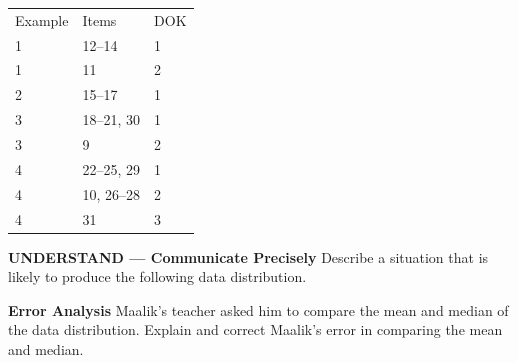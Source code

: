 \documentclass{article}
\newenvironment{item-analysis}{}{}      %
\newenvironment{practice}[2]{}{}        %
\newcommand{\answer}[1]{}               %
\newcommand{\placeholder}[2]{}          %
\newcommand{\te}[1]{}                   %
\begin{document}
\begin{item-analysis}
\begin{tabular}{lll}
Example & Items & DOK \\
1 & 12--14 & 1 \\
1 & 11 & 2 \\
2 & 15--17 & 1 \\
3 & 18--21, 30 & 1 \\
3 & 9 & 2 \\
4 & 22--25, 29 & 1 \\
4 & 10, 26--28 & 2 \\
4 & 31 & 3 \\
\end{tabular}
\end{item-analysis}
\begin{practice}{9}{2}
\textbf{UNDERSTAND — Communicate Precisely} Describe a situation that is likely to produce the following data distribution.
\placeholder{graph}{Six separated green bars at horizontal values 1,2,3,4,5,6. Vertical ticks 0,.05,.10,.15,.20. Heights approximately .16,.15,.14,.16,.18,.16. No axis titles or arrows.}
\answer{Sample: The probability of drawing each of 6 colored marbles from a hat, replacing the marble for each draw.}
\end{practice}
\begin{practice}{10}{2}
\textbf{Error Analysis} Maalik's teacher asked him to compare the mean and median of the data distribution. Explain and correct Maalik's error in comparing the mean and median.
\placeholder{graph}{Red curve rises steeply from lower left to a peak near the left and descends gradually into a long right tail. Unscaled horizontal and vertical axes, arrowheads at positive ends; no labels or ticks.}
\te{Student work marked incorrect: The distribution is skewed right. This implies the mean is less than the median.}
\answer{Maurice is correct that the distribution is skewed right. Maurice incorrectly concluded that the mean is less than the median. The mean is greater than the median.}
\te{Printed Maurice in the key; the prompt names Maalik.}
\end{practice}
\end{document}
